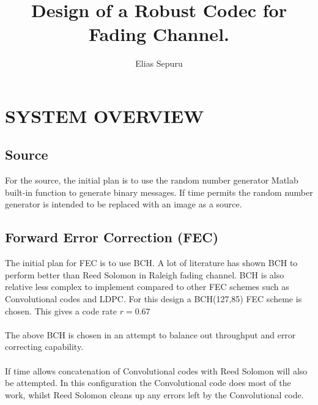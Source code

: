 \documentclass[]{article}
\title{Design of a Robust Codec for Fading Channel.}
\author{Elias Sepuru}
\begin{document}
\maketitle



\section*{SYSTEM OVERVIEW}

\subsection*{Source}
For the source, the initial plan is to use the random number generator Matlab built-in function to generate binary messages. If time permits the random number generator is intended to be replaced with an image as a source.

\subsection*{Forward Error Correction (FEC)}
The initial plan for FEC is to use BCH. A lot of literature has shown BCH to perform better than Reed Solomon in Raleigh fading channel. BCH is also relative less complex to implement compared to other FEC schemes such as Convolutional codes and LDPC. For this design a BCH(127,85) FEC scheme is chosen. This gives a code rate $r = 0.67$
\\
\\
The above BCH is chosen in an attempt to balance out throughput and error correcting capability.
\\
\\
If time allows concatenation of Convolutional codes with Reed Solomon will also be attempted. In this configuration the Convolutional code does most of the work, whilst Reed Solomon cleans up any errors left by  the Convolutional code. 
\end{document}
